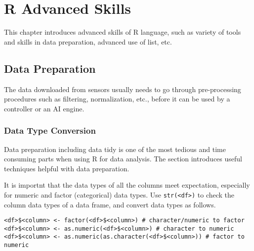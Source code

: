 \chapter{R Advanced Skills} \label{ch:r2}

This chapter introduces advanced skills of R language, such as variety of tools and skills in data preparation, advanced use of list, etc.

\section{Data Preparation} \label{ch:r2:sec:datapreparation}

The data downloaded from sensors usually needs to go through pre-processing procedures such as filtering, normalization, etc., before it can be used by a controller or an AI engine.

\subsection{Data Type Conversion}

Data preparation including data tidy is one of the most tedious and time consuming parts when using R for data analysis. The section introduces useful techniques helpful with data preparation.

It is importnt that the data types of all the columns meet expectation, especially for numeric and factor (categorical) data types. Use \verb|str(<df>)| to check the column data types of a data frame, and convert data types as follows.
\begin{lstlisting}
<df>$<column> <- factor(<df>$<column>) # character/numeric to factor
<df>$<column> <- as.numeric(<df>$<column>) # character to numeric
<df>$<column> <- as.numeric(as.character(<df>$<column>)) # factor to numeric
\end{lstlisting}

